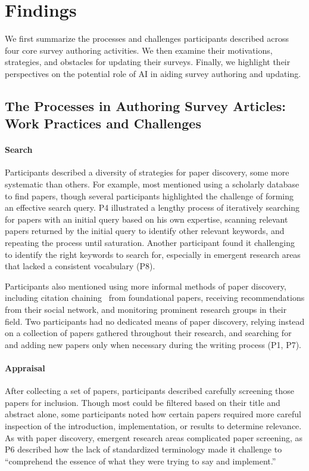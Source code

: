 \section{Findings} \label{sec:findings}
We first summarize the processes and challenges participants described across four core survey authoring activities. We then examine their motivations, strategies, and obstacles for updating their surveys. Finally, we highlight their perspectives on the potential role of AI in aiding survey authoring and updating.

\subsection{The Processes in Authoring Survey Articles: Work Practices and Challenges}

\paragraph{\textbf{Search}}
Participants described a diversity of strategies for paper discovery, some more systematic than others. For example, most mentioned using a scholarly database to find papers, though several participants highlighted the challenge of forming an effective search query. P4 illustrated a lengthy process of iteratively searching for papers with an initial query based on his own expertise, scanning relevant papers returned by the initial query to identify other relevant keywords, and repeating the process until saturation. Another participant found it challenging to identify the right keywords to search for, especially in emergent research areas that lacked a consistent vocabulary (P8). 

Participants also mentioned using more informal methods of paper discovery, including citation chaining~\cite{webster2002analyzing} from foundational papers, receiving recommendations from their social network, and monitoring prominent research groups in their field. Two participants had no dedicated means of paper discovery, relying instead on a collection of papers gathered throughout their research, and searching for and adding new papers only when necessary during the writing process (P1, P7).

\paragraph{\textbf{Appraisal}}
After collecting a set of papers, participants described carefully screening those papers for inclusion. Though most could be filtered based on their title and abstract alone, some participants noted how certain papers required more careful inspection of the introduction, implementation, or results to determine relevance. As with paper discovery, emergent research areas complicated paper screening, as P6 described how the lack of standardized terminology made it challenge to ``comprehend the essence of what they were trying to say and implement.''

